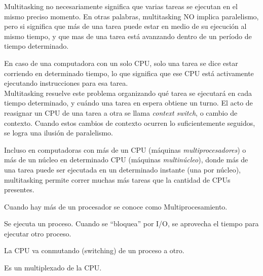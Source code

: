 \documentclass[a4paper, twoside]{article}
\begin{document}
Multitasking no necesariamente significa que varias tareas se ejecutan en el mismo preciso momento. En otras palabras, multitasking NO implica paralelismo, pero si significa que más de una tarea puede estar en medio de su ejecución al mismo tiempo, y que mas de una tarea está avanzando dentro de un período de tiempo determinado.

En caso de una computadora con un solo CPU, solo una tarea se dice estar corriendo en determinado tiempo, lo que significa que ese CPU está activamente ejecutando instrucciones para esa tarea.\\
Multitasking resuelve este problema organizando qué tarea se ejecutará en cada tiempo determinado, y cuándo una tarea en espera obtiene un turno. El acto de reasignar un CPU de una tarea a otra se llama \emph{context switch}, o cambio de contexto. Cuando estos cambios de contexto ocurren lo suficientemente seguidos, se logra una ilusión de paralelismo.

Incluso en computadoras con más de un CPU (máquinas \emph{multiprocesadores}) o más de un núcleo en determinado CPU (máquinas \emph{multinúcleo}), donde más de una tarea puede ser ejecutada en un determinado instante (una por núcleo), multitasking permite correr muchas más tareas que la cantidad de CPUs presentes.

Cuando hay más de un procesador se conoce como Multiprocesamiento.

Se ejecuta un proceso. Cuando se ``bloquea'' por I/O, se aprovecha el tiempo para ejecutar otro proceso.

La CPU va conmutando (switching) de un proceso a otro.

Es un multiplexado de la CPU.
\end{document}
